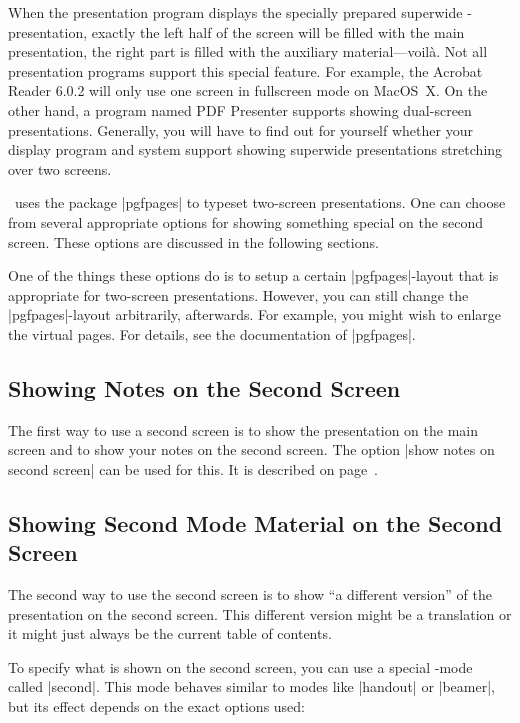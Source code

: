 When the presentation program displays the specially prepared superwide \beamer-presentation, exactly the left half of the screen will be filled with the main presentation, the right part is filled with the auxiliary material---voil\`a. Not all presentation programs support this special feature. For example, the Acrobat Reader 6.0.2 will only use one screen in fullscreen mode on MacOS~X. On the other hand, a program named PDF Presenter supports showing dual-screen presentations. Generally, you will have to find out for yourself whether your display program and system support showing superwide presentations stretching over two screens.

\beamer\ uses the package |pgfpages| to typeset two-screen presentations. One can choose from several appropriate options for showing something special on the second screen. These options are discussed in the following sections.

One of the things these options do is to setup a certain |pgfpages|-layout that is appropriate for two-screen presentations. However, you can still change the |pgfpages|-layout arbitrarily, afterwards. For example, you might wish to enlarge the virtual pages. For details, see the documentation of |pgfpages|.

\subsection{Showing Notes on the Second Screen}

The first way to use a second screen is to show the presentation on the main screen and to show your notes on the second screen. The option |show notes on second screen| can be used for this. It is described on page~\pageref{command-notesonsecondscreen}.


\subsection{Showing Second Mode Material on the Second Screen}

The second way to use the second screen is to show ``a different version'' of the presentation on the second screen. This different version might be a translation or it might just always be the current table of contents.

To specify what is shown on the second screen, you can use a special \beamer-mode called |second|. This mode behaves similar to modes like |handout| or |beamer|, but its effect depends on the exact options used:

